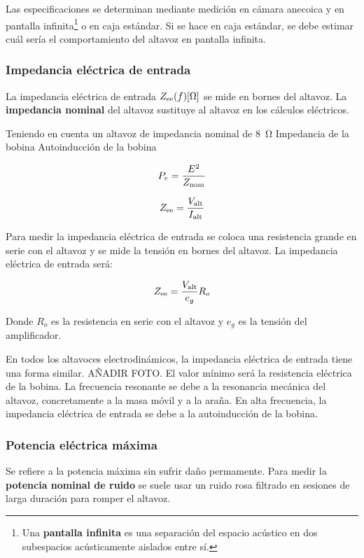 \documentclass[10pt]{book}
\begin{document}
Las especificaciones se determinan mediante medición en cámara anecoica y en pantalla infinita\footnote{Una \textbf{pantalla infinita} es una separación del espacio acústico en dos subespacios acústicamente aislados entre sí.} o en caja estándar. Si se hace en caja estándar, se debe estimar cuál sería el comportamiento del altavoz en pantalla infinita.

\subsubsection{Impedancia eléctrica de entrada}

La impedancia eléctrica de entrada $Z _{\textnormal{ee}}(f) [\SI{}{\ohm}]$ se mide en bornes del altavoz. La \textbf{impedancia nominal} del altavoz sustituye al altavoz en los cálculos eléctricos.

Teniendo en cuenta un altavoz de impedancia nominal de \SI{8}{\ohm}
Impedancia de la bobina
Autoinducción de la bobina

\[ P_e = \frac{E^2}{Z _{\textnormal{nom}}} \]

\[ Z _{\textnormal{ee}} = \frac{V _{\textnormal{alt}}}{I _{\textnormal{alt}}} \]

Para medir la impedancia eléctrica de entrada se coloca una resistencia grande en serie con el altavoz y se mide la tensión en bornes del altavoz. La impedancia eléctrica de entrada será:

\[ Z _{\textnormal{ee}} = \frac{V _{\textnormal{alt}}}{e_g} R_o \]

Donde $R_o$ es la resistencia en serie con el altavoz y $e_g$ es la tensión del amplificador.

En todos los altavoces electrodinámicos, la impedancia eléctrica de entrada tiene una forma similar. AÑADIR FOTO. El valor mínimo será la resistencia eléctrica de la bobina. La frecuencia resonante se debe a la resonancia mecánica del altavoz, concretamente a la masa móvil y a la araña. En alta frecuencia, la impedancia eléctrica de entrada se debe a la autoinducción de la bobina.

\subsubsection{Potencia eléctrica máxima}

Se refiere a la potencia máxima sin sufrir daño permamente. Para medir la \textbf{potencia nominal de ruido} se suele usar un ruido rosa filtrado en sesiones de larga duración para romper el altavoz.
\end{document}

